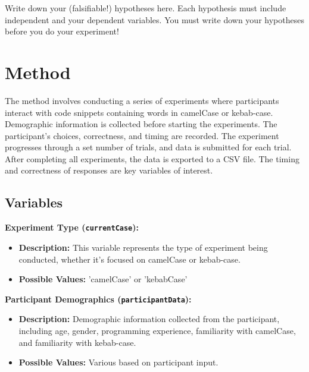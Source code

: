 \documentclass{article}
\begin{document}
\begin{tcolorbox}[title=Hypotheses:, colback=white, colframe=black, arc=0pt, outer arc=0pt]
    Write down your (falsifiable!) hypotheses here. Each hypothesis must include independent and your dependent variables. You must write down your hypotheses before you do your experiment!


\end{tcolorbox}



\section{Method}
The method involves conducting a series of experiments where participants interact with code snippets containing words in camelCase or kebab-case. Demographic information is collected before starting the experiments. The participant's choices, correctness, and timing are recorded. The experiment progresses through a set number of trials, and data is submitted for each trial. After completing all experiments, the data is exported to a CSV file. The timing and correctness of responses are key variables of interest.
\subsection{Variables}

\begin{tcolorbox}[title=Independent Variables]

\textbf{Experiment Type (\texttt{currentCase}):}
\begin{itemize}
    \item \textbf{Description:} This variable represents the type of experiment being conducted, whether it's focused on camelCase or kebab-case.
    \item \textbf{Possible Values:} 'camelCase' or 'kebabCase'
\end{itemize}

\textbf{Participant Demographics (\texttt{participantData}):}
\begin{itemize}
    \item \textbf{Description:} Demographic information collected from the participant, including age, gender, programming experience, familiarity with camelCase, and familiarity with kebab-case.
    \item \textbf{Possible Values:} Various based on participant input.
\end{itemize}

\end{tcolorbox}
\end{document}

